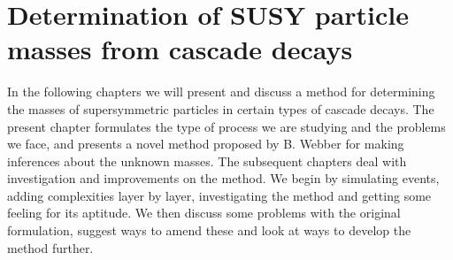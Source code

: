\documentclass[twoside,english]{uiofysmaster}
\begin{document}





\chapter{Determination of SUSY particle masses from cascade decays}
\label{ch:introducing_the_method}
In the following chapters we will present and discuss a method for determining the masses of supersymmetric particles in certain types of cascade decays. The present chapter formulates the type of process we are studying and the problems we face, and presents a novel method proposed by B. Webber \cite{Webber:2009vm} for making inferences about the unknown masses. The subsequent chapters deal with investigation and improvements on the method. We begin by simulating events, adding complexities layer by layer, investigating the method and getting some feeling for its aptitude. We then discuss some problems with the original formulation, suggest ways to amend these and look at ways to develop the method further.
\end{document}
